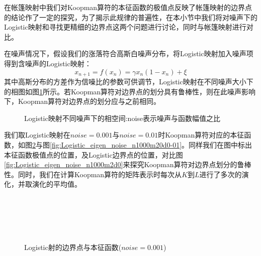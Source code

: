 在帐篷映射中我们对Koopman算符的本征函数的极值点反映了帐篷映射的边界点的结论作了一定的探究，为了揭示此规律的普遍性，在本小节中我们将对噪声下的Logistic映射和寻找更精细的边界点这两个问题进行讨论，同时与帐篷映射进行对比。

在噪声情况下，假设我们的涨落符合高斯白噪声分布，将Logistic映射加入噪声项得到含噪声的Logistic映射：
\begin{equation}
  x_{n+1}=f(x_n)=\gamma x_n(1-x_n)+\xi
\end{equation}
其中高斯分布的方差作为信噪比的参数可供调节，Logistic映射在不同噪声大小下的相图如图\ref{fig:Logistic_noise_phase_d0}所示。若Koopman算符对边界点的划分具有鲁棒性，则在此噪声影响下，Koopman算符对边界点的划分应与之前相同。


\begin{figure}[!]
    \centering
    \caption[Logistic映射不同噪声下的相空间]{Logistic映射不同噪声下的相空间:noise表示噪声与函数幅值之比}\label{fig:Logistic_noise_phase_d0}
\end{figure}

我们取Logistic映射在$noise=0.001$与$noise=0.01$时Koopman算符对应的本征函数，如图\ref{fig:Logistic_eigen_noise_n1000m20d0-001}与图\ref{fig:Logistic_eigen_noise_n1000m20d0-01}。同样我们在图中标出本征函数极值点的位置，及Logistic边界点的位置，对比图\ref{fig:Logistic_eigen_noise_n1000m2d0}来探究Koopman算符对边界点划分的鲁棒性。同时，我们在计算Koopman算符的矩阵表示时每次从$K$到$L$进行了多次的演化，并取演化的平均值。



\begin{figure}[!]
    \centering%
      \\
      \\
      \\
      \\
    \caption{Logistic射的边界点与本征函数($noise=0.001$)}\label{fig:Logistic_eigen_noise_n1000m20d0-001}
\end{figure}
  
